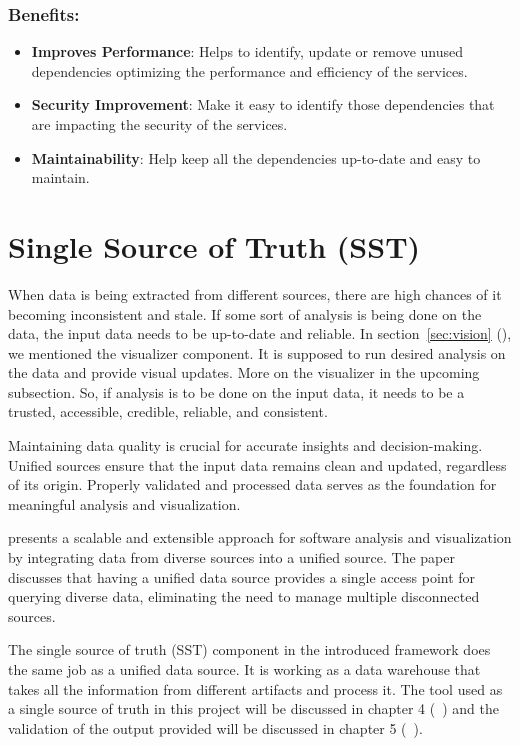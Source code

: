 \subsubsection{Benefits:}
\begin{itemize}[label=$\bullet$]
	\item \textbf{Improves Performance}: Helps to identify, update or remove unused dependencies optimizing the performance and efficiency of the services.
	\item \textbf{Security Improvement}: Make it easy to identify those dependencies that are impacting the security of the services.
	\item \textbf{Maintainability}: Help keep all the dependencies up-to-date and easy to maintain.
\end{itemize} 

\section{Single Source of Truth (SST)}\label{sec:component-sst}

When data is being extracted from different sources, there are high chances of it becoming inconsistent and stale. If some sort of analysis is being done on the data, the input data needs to be up-to-date and reliable. In section~\ref{sec:vision} (), we mentioned the visualizer component. It is supposed to run desired analysis on the data and provide visual updates. More on the visualizer in the upcoming subsection. So, if analysis is to be done on the input data, it needs to be a trusted, accessible, credible, reliable, and consistent.

Maintaining data quality is crucial for accurate insights and decision-making. Unified sources ensure that the input data remains clean and updated, regardless of its origin. Properly validated and processed data serves as the foundation for meaningful analysis and visualization.

\citep{MullerUdsforSA2018} presents a scalable and extensible approach for software analysis and visualization by integrating data from diverse sources into a unified source. The paper discusses that having a unified data source provides a single access point for querying diverse data, eliminating the need to manage multiple disconnected sources. 

The single source of truth (SST) component in the introduced framework does the same job as a unified data source. It is working as a data warehouse that takes all the information from different artifacts and process it. The tool used as a single source of truth in this project will be discussed in chapter 4 (~) and the validation of the output provided will be discussed in chapter 5 (~).


